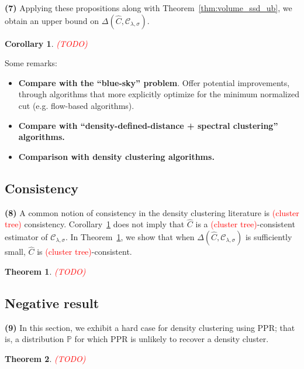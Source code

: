 \documentclass{article}
\newcommand{\1}{\mathbf{1}}
\newcommand{\mc}[1]{\mathcal{#1}}
\newcommand{\Pbb}{\mathbb{P}}
\newcommand{\wh}[1]{\widehat{#1}}
\theoremstyle{alden}
\theoremstyle{aldenthm}
\newtheorem{theorem}{Theorem}
\newtheorem{corollary}{Corollary}
\theoremstyle{definition}
\theoremstyle{remark}
\begin{document}
\textbf{(7)} Applying these propositions along with Theorem~\ref{thm:volume_ssd_ub}, we obtain an upper bound on $\Delta(\wh{C},\mc{C}_{\lambda,\sigma})$. 

\begin{corollary}
	\label{cor:density_cluster_volume_ssd_ub}
	\textcolor{red}{(TODO)}
\end{corollary}

Some remarks:
\begin{itemize}
	\item \textbf{Compare with the ``blue-sky'' problem}. Offer potential improvements, through algorithms that more explicitly optimize for the minimum normalized cut (e.g. flow-based algorithms).
	\item \textbf{Compare with ``density-defined-distance + spectral clustering'' algorithms.}
	\item \textbf{Comparison with density clustering algorithms.}
\end{itemize}

\subsection{Consistency}

\textbf{(8)} A common notion of consistency in the density clustering literature is \textcolor{red}{(cluster tree)} consistency. Corollary~\ref{cor:density_cluster_volume_ssd_ub} does not imply that $\wh{C}$ is a \textcolor{red}{(cluster tree)}-consistent estimator of $\mc{C}_{\lambda,\sigma}$. In Theorem~\ref{thm:density_cluster_consistent_recovery}, we show that when $\Delta(\wh{C},\mc{C}_{\lambda,\sigma})$ is sufficiently small, $\wh{C}$ is \textcolor{red}{(cluster tree)}-consistent.

\begin{theorem}
	\label{thm:density_cluster_consistent_recovery} \textcolor{red}{(TODO)}
\end{theorem}

\subsection{Negative result}
\textbf{(9)} In this section, we exhibit a hard case for density clustering using PPR; that is, a distribution $\Pbb$ for which PPR is unlikely to recover a density
cluster.

\begin{theorem}
\textcolor{red}{(TODO)}
\end{theorem}
\end{document}
